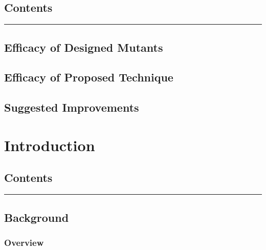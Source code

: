 \hypertarget{contents-16}{%
\subsection{Contents}\label{contents-16}}

\begin{center}\rule{0.5\linewidth}{0.5pt}\end{center}

\hypertarget{efficacy-of-designed-mutants}{%
\subsection{Efficacy of Designed
Mutants}\label{efficacy-of-designed-mutants}}

\hypertarget{efficacy-of-proposed-technique}{%
\subsection{Efficacy of Proposed
Technique}\label{efficacy-of-proposed-technique}}

\hypertarget{suggested-improvements}{%
\subsection{Suggested Improvements}\label{suggested-improvements}}

\hypertarget{introduction-1}{%
\section{Introduction}\label{introduction-1}}

\hypertarget{contents-17}{%
\subsection{Contents}\label{contents-17}}

\begin{center}\rule{0.5\linewidth}{0.5pt}\end{center}

\hypertarget{background-1}{%
\subsection{Background}\label{background-1}}

\hypertarget{overview-8}{%
\subsubsection{Overview}\label{overview-8}}


